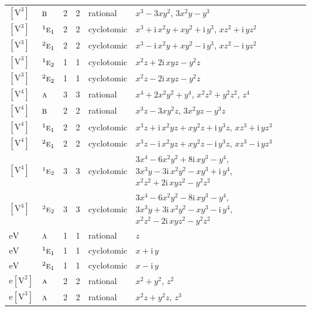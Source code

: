 \documentclass[10pt,a4paper]{article}
\numberwithin{equation}{section}
\newcommand{\irr}[1]{\text{\normalfont\scshape #1}}
\newcommand{\conjpair}[1]{{}^{#1}}
\newcommand{\iunit}{\mathrm{i}}
\newcommand{\jahn}[1]{\mathrm{#1}}
\newlength{\fillwidth}\newlength{\cellwidth}\newlength{\colwidth}
\begin{document}
{\begin{longtable}{@{}llrrl>{\RaggedRight\arraybackslash}p{\fillwidth}@{}}
$\jahn{[V^{3}]}$ & $\irr{b}$ & 2 & 2 & rational & $x^{3} - 3xy^{2}$, $3x^{2}y - y^{3}$\\
$\jahn{[V^{3}]}$ & $\conjpair{1}\irr{e}_{1}$ & 2 & 2 & cyclotomic & $x^{3} + \iunit{}\,x^{2}y + xy^{2} + \iunit{}\,y^{3}$, $xz^{2} + \iunit{}\,yz^{2}$\\
$\jahn{[V^{3}]}$ & $\conjpair{2}\irr{e}_{1}$ & 2 & 2 & cyclotomic & $x^{3} - \iunit{}\,x^{2}y + xy^{2} - \iunit{}\,y^{3}$, $xz^{2} - \iunit{}\,yz^{2}$\\
$\jahn{[V^{3}]}$ & $\conjpair{1}\irr{e}_{2}$ & 1 & 1 & cyclotomic & $x^{2}z + 2\iunit{}\,xyz - y^{2}z$\\
$\jahn{[V^{3}]}$ & $\conjpair{2}\irr{e}_{2}$ & 1 & 1 & cyclotomic & $x^{2}z - 2\iunit{}\,xyz - y^{2}z$\\
$\jahn{[V^{4}]}$ & $\irr{a}$ & 3 & 3 & rational & $x^{4} + 2x^{2}y^{2} + y^{4}$, $x^{2}z^{2} + y^{2}z^{2}$, $z^{4}$\\
$\jahn{[V^{4}]}$ & $\irr{b}$ & 2 & 2 & rational & $x^{3}z - 3xy^{2}z$, $3x^{2}yz - y^{3}z$\\
$\jahn{[V^{4}]}$ & $\conjpair{1}\irr{e}_{1}$ & 2 & 2 & cyclotomic & $x^{3}z + \iunit{}\,x^{2}yz + xy^{2}z + \iunit{}\,y^{3}z$, $xz^{3} + \iunit{}\,yz^{3}$\\
$\jahn{[V^{4}]}$ & $\conjpair{2}\irr{e}_{1}$ & 2 & 2 & cyclotomic & $x^{3}z - \iunit{}\,x^{2}yz + xy^{2}z - \iunit{}\,y^{3}z$, $xz^{3} - \iunit{}\,yz^{3}$\\
$\jahn{[V^{4}]}$ & $\conjpair{1}\irr{e}_{2}$ & 3 & 3 & cyclotomic & $3x^{4} - 6x^{2}y^{2} + 8\iunit{}\,xy^{3} - y^{4}$, $3x^{3}y - 3\iunit{}\,x^{2}y^{2} - xy^{3} + \iunit{}\,y^{4}$, $x^{2}z^{2} + 2\iunit{}\,xyz^{2} - y^{2}z^{2}$\\
$\jahn{[V^{4}]}$ & $\conjpair{2}\irr{e}_{2}$ & 3 & 3 & cyclotomic & $3x^{4} - 6x^{2}y^{2} - 8\iunit{}\,xy^{3} - y^{4}$, $3x^{3}y + 3\iunit{}\,x^{2}y^{2} - xy^{3} - \iunit{}\,y^{4}$, $x^{2}z^{2} - 2\iunit{}\,xyz^{2} - y^{2}z^{2}$\\
$\jahn{eV}$ & $\irr{a}$ & 1 & 1 & rational & $z$\\
$\jahn{eV}$ & $\conjpair{1}\irr{e}_{1}$ & 1 & 1 & cyclotomic & $x + \iunit{}\,y$\\
$\jahn{eV}$ & $\conjpair{2}\irr{e}_{1}$ & 1 & 1 & cyclotomic & $x - \iunit{}\,y$\\
$\jahn{e[V^{2}]}$ & $\irr{a}$ & 2 & 2 & rational & $x^{2} + y^{2}$, $z^{2}$\\
$\jahn{e[V^{3}]}$ & $\irr{a}$ & 2 & 2 & rational & $x^{2}z + y^{2}z$, $z^{3}$\\

\end{longtable}}
\end{document}
